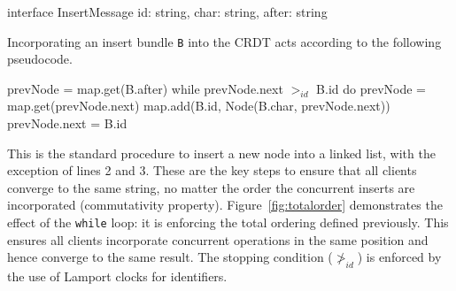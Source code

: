 \documentclass[12pt,a4paper,twoside,openright]{report}
\begin{document}
\vspace{3mm}	
\begin{typescript}
interface InsertMessage {
    id: string,
    char: string,
    after: string
}
\end{typescript}
				
				Incorporating an insert bundle \texttt{B} into the CRDT acts according to the following pseudocode.
				
\begin{typescript}
 prevNode = map.get(B.after)
 while prevNode.next $>_{id}$ B.id do
   prevNode = map.get(prevNode.next)
 map.add(B.id, Node(B.char, prevNode.next))
 prevNode.next = B.id
\end{typescript}
				
				This is the standard procedure to insert a new node into a linked list, with the exception of lines 2 and 3. These are the key steps to ensure that all clients converge to the same string, no matter the order the concurrent inserts are incorporated (commutativity property). Figure~\ref{fig:totalorder} demonstrates the effect of the \texttt{while} loop: it is enforcing the total ordering defined previously. This ensures all clients incorporate concurrent operations in the same position and hence converge to the same result. The stopping condition ($\not >_{id}$) is enforced by the use of Lamport clocks for identifiers.
				
\end{document}
